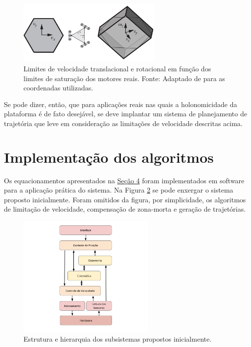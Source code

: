 \begin{figure}[h]
  \centering
  \includegraphics[width = 0.63\textwidth]{imagens/twist_sat}
  \caption{Limites de velocidade translacional e rotacional em função dos limites de saturação dos motores reais. Fonte: Adaptado de \citet{lynch2017modern} para as coordenadas utilizadas.}
  \label{fig:twist_sat}
\end{figure}

Se pode dizer, então, que para aplicações reais nas quais a holonomicidade da plataforma é de fato desejável, se deve implantar um sistema de planejamento de trajetória que leve em consideração as limitações de velocidade descritas acima.

\section{Implementação dos algoritmos}
\label{sec:software}

Os equacionamentos apresentados na \hyperref[sec:teorico]{Seção 4} foram implementados em software para a aplicação prática do sistema. Na Figura \ref{fig:sistema} se pode enxergar o sistema proposto inicialmente. Foram omitidos da figura, por simplicidade, os algoritmos de limitação de velocidade, compensação de zona-morta e geração de trajetórias.

\begin{figure}[h]
  \centering
  \includegraphics[width = 0.6\textwidth]{imagens/sistema}
  \caption{Estrutura e hierarquia dos subsistemas propostos inicialmente.}
  \label{fig:sistema}
\end{figure}


